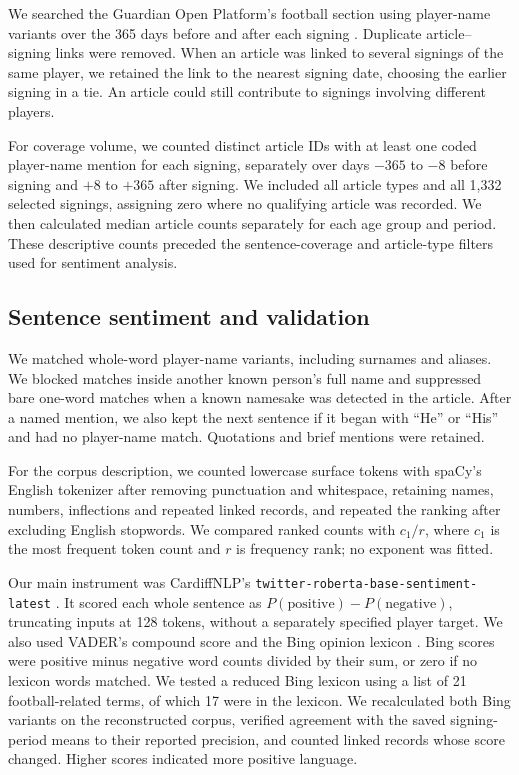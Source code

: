 We searched the Guardian Open Platform's football section using player-name variants over the 365 days before and after each signing \cite{guardian_api}. Duplicate article--signing links were removed. When an article was linked to several signings of the same player, we retained the link to the nearest signing date, choosing the earlier signing in a tie. An article could still contribute to signings involving different players.

For coverage volume, we counted distinct article IDs with at least one coded player-name mention for each signing, separately over days $-365$ to $-8$ before signing and $+8$ to $+365$ after signing. We included all article types and all 1,332 selected signings, assigning zero where no qualifying article was recorded. We then calculated median article counts separately for each age group and period. These descriptive counts preceded the sentence-coverage and article-type filters used for sentiment analysis.

\subsection*{Sentence sentiment and validation}

We matched whole-word player-name variants, including surnames and aliases. We blocked matches inside another known person's full name and suppressed bare one-word matches when a known namesake was detected in the article. After a named mention, we also kept the next sentence if it began with ``He'' or ``His'' and had no player-name match. Quotations and brief mentions were retained.

For the corpus description, we counted lowercase surface tokens with spaCy's English tokenizer after removing punctuation and whitespace, retaining names, numbers, inflections and repeated linked records, and repeated the ranking after excluding English stopwords. We compared ranked counts with $c_1/r$, where $c_1$ is the most frequent token count and $r$ is frequency rank; no exponent was fitted.

Our main instrument was CardiffNLP's \nolinkurl{twitter-roberta-base-sentiment-latest} \cite{liu2019roberta,loureiro2022timelms,camachocollados2022tweetnlp,cardiffnlp2022checkpoint}. It scored each whole sentence as $P(\mathrm{positive})-P(\mathrm{negative})$, truncating inputs at 128 tokens, without a separately specified player target. We also used VADER's compound score \cite{hutto2014vader,vader_documentation} and the Bing opinion lexicon \cite{hu2004mining,textdata_bing_documentation}. Bing scores were positive minus negative word counts divided by their sum, or zero if no lexicon words matched. We tested a reduced Bing lexicon using a list of 21 football-related terms, of which 17 were in the lexicon. We recalculated both Bing variants on the reconstructed corpus, verified agreement with the saved signing-period means to their reported precision, and counted linked records whose score changed. Higher scores indicated more positive language.

